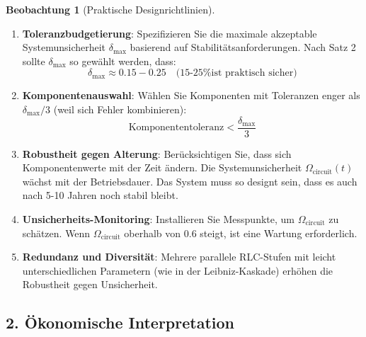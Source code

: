 \documentclass[a4paper, 12pt, twoside, openright]{report}
\theoremstyle{definition}
\newtheorem{beobachtung}{Beobachtung}
\theoremstyle{definition}
\begin{document}
\begin{beobachtung}[Praktische Designrichtlinien]

\begin{enumerate}
    \item \textbf{Toleranzbudgetierung}: Spezifizieren Sie die maximale akzeptable Systemunsicherheit $\delta_{\max}$ basierend auf Stabilitätsanforderungen. Nach Satz 2 sollte $\delta_{\max}$ so gewählt werden, dass:
    \begin{equation}
    \delta_{\max} \approx 0.15 - 0.25 \quad \text{(15-25\% ist praktisch sicher)}
    \end{equation}
    
    \item \textbf{Komponentenauswahl}: Wählen Sie Komponenten mit Toleranzen enger als $\delta_{\max}/3$ (weil sich Fehler kombinieren):
    \begin{equation}
    \text{Komponententoleranz} < \frac{\delta_{\max}}{3}
    \end{equation}
    
    \item \textbf{Robustheit gegen Alterung}: Berücksichtigen Sie, dass sich Komponentenwerte mit der Zeit ändern. Die Systemunsicherheit $\Omega_{\text{circuit}}(t)$ wächst mit der Betriebsdauer. Das System muss so designt sein, dass es auch nach 5-10 Jahren noch stabil bleibt.
    
    \item \textbf{Unsicherheits-Monitoring}: Installieren Sie Messpunkte, um $\Omega_{\text{circuit}}$ zu schätzen. Wenn $\Omega_{\text{circuit}}$ oberhalb von 0.6 steigt, ist eine Wartung erforderlich.
    
    \item \textbf{Redundanz und Diversität}: Mehrere parallele RLC-Stufen mit leicht unterschiedlichen Parametern (wie in der Leibniz-Kaskade) erhöhen die Robustheit gegen Unsicherheit.
\end{enumerate}

\end{beobachtung}

\subsection{2. Ökonomische Interpretation}
\end{document}

